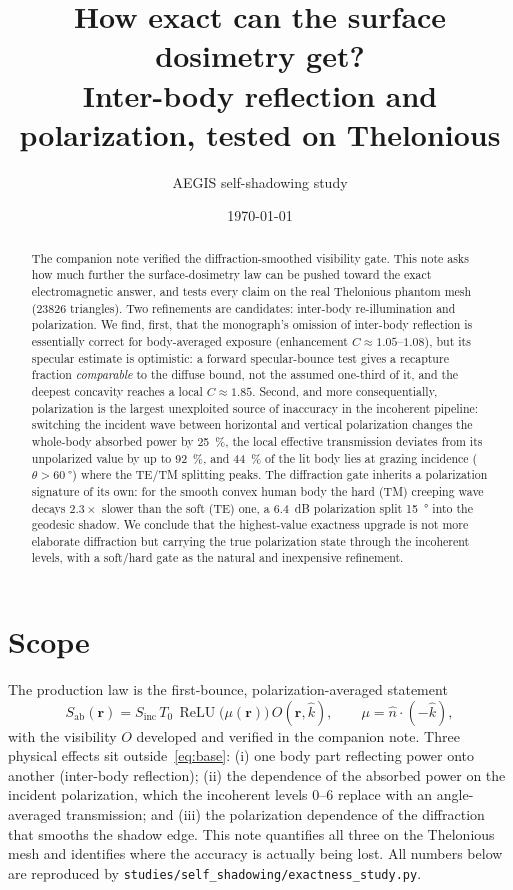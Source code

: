 \documentclass[11pt]{article}
\title{How exact can the surface dosimetry get?\\
\large Inter-body reflection and polarization, tested on Thelonious}
\author{AEGIS self-shadowing study}
\date{\today}
\newcommand{\ReLU}{\ensuremath{\operatorname{ReLU}}}
\newcommand{\Sab}{\ensuremath{S_{\mathrm{ab}}}}
\newcommand{\Sinc}{\ensuremath{S_{\mathrm{inc}}}}
\newcommand{\khat}{\ensuremath{\hat{k}}}
\newcommand{\nhat}{\ensuremath{\hat{n}}}
\newcommand{\rr}{\ensuremath{\mathbf{r}}}
\begin{document}
\maketitle

\begin{abstract}
The companion note verified the diffraction-smoothed visibility gate. This
note asks how much further the surface-dosimetry law can be pushed toward
the exact electromagnetic answer, and tests every claim on the real
Thelonious phantom mesh (\num{23826} triangles). Two refinements are
candidates: inter-body re-illumination and polarization. We find, first,
that the monograph's omission of inter-body reflection is essentially
correct for body-averaged exposure (enhancement $C\approx 1.05$--$1.08$),
but its specular estimate is optimistic: a forward specular-bounce test
gives a recapture fraction \emph{comparable} to the diffuse bound, not the
assumed one-third of it, and the deepest concavity reaches a local
$C\approx 1.85$. Second, and more consequentially, polarization is the
largest unexploited source of inaccuracy in the incoherent pipeline:
switching the incident wave between horizontal and vertical polarization
changes the whole-body absorbed power by \SI{25}{\percent}, the local
effective transmission deviates from its unpolarized value by up to
\SI{92}{\percent}, and \SI{44}{\percent} of the lit body lies at grazing
incidence ($\theta>\SI{60}{\degree}$) where the TE/TM splitting peaks.
The diffraction gate inherits a polarization signature of its own: for the
smooth convex human body the hard (TM) creeping wave decays
$2.3\times$ slower than the soft (TE) one, a \SI{6.4}{\dB} polarization
split \SI{15}{\degree} into the geodesic shadow. We conclude that the
highest-value exactness upgrade is not more elaborate diffraction but
carrying the true polarization state through the incoherent levels, with a
soft/hard gate as the natural and inexpensive refinement.
\end{abstract}

\section{Scope}

The production law is the first-bounce, polarization-averaged statement
\begin{equation}\label{eq:base}
  \Sab(\rr) = \Sinc\,T_0\,\ReLU\!\bigl(\mu(\rr)\bigr)\,O(\rr,\khat),
  \qquad \mu = \nhat\cdot(-\khat),
\end{equation}
with the visibility $O$ developed and verified in the companion note. Three
physical effects sit outside~\eqref{eq:base}: (i) one body part reflecting
power onto another (inter-body reflection); (ii) the dependence of the
absorbed power on the incident polarization, which the incoherent levels
0--6 replace with an angle-averaged transmission; and (iii) the
polarization dependence of the diffraction that smooths the shadow edge.
This note quantifies all three on the Thelonious mesh and identifies where
the accuracy is actually being lost. All numbers below are reproduced by
\texttt{studies/self\_shadowing/exactness\_study.py}.
\end{document}
